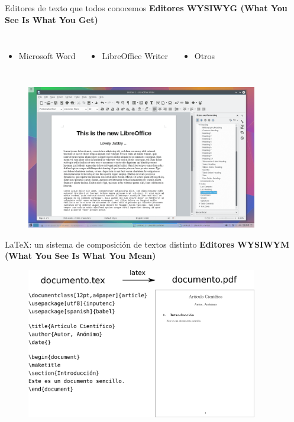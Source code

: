 \documentclass[11pt]{beamer}
\begin{document}
\begin{frame}{Editores de texto que todos conocemos}
\pause
\textbf{Editores WYSIWYG (What You See Is What You Get)}
\begin{columns}
\begin{itemize}
  \item \small{Microsoft Word}
\end{itemize}  
\begin{itemize}
  \item \small{LibreOffice Writer}
\end{itemize}
\begin{itemize}
  \item \small{Otros}
\end{itemize}
\end{columns}

\begin{figure}[b]
  \centering
  \includegraphics[width=0.9\textwidth]{figs/libreoffice-writer-sample.png}
\end{figure}
\end{frame}

\begin{frame}{{\LaTeX}: un sistema de composición de textos distinto}
\textbf{Editores WYSIWYM (What You See Is What You Mean)}
\begin{figure}
\centering
\includegraphics[width=0.9\textwidth]{figs/tex-to-pdf.pdf}
\end{figure}
\end{frame}
\end{document}
